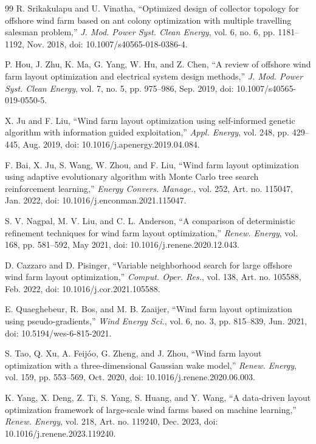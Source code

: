 \documentclass[journal,twoside]{IEEEtran}
\begin{document}
\begin{thebibliography}{99}
R. Srikakulapu and U. Vinatha, ``Optimized design of collector topology for offshore wind farm based on ant colony optimization with multiple travelling salesman problem,'' \textit{J. Mod. Power Syst. Clean Energy}, vol. 6, no. 6, pp. 1181--1192, Nov. 2018, doi: 10.1007/s40565-018-0386-4.

P. Hou, J. Zhu, K. Ma, G. Yang, W. Hu, and Z. Chen, ``A review of offshore wind farm layout optimization and electrical system design methods,'' \textit{J. Mod. Power Syst. Clean Energy}, vol. 7, no. 5, pp. 975--986, Sep. 2019, doi: 10.1007/s40565-019-0550-5.

X. Ju and F. Liu, ``Wind farm layout optimization using self-informed genetic algorithm with information guided exploitation,'' \textit{Appl. Energy}, vol. 248, pp. 429--445, Aug. 2019, doi: 10.1016/j.apenergy.2019.04.084.

F. Bai, X. Ju, S. Wang, W. Zhou, and F. Liu, ``Wind farm layout optimization using adaptive evolutionary algorithm with Monte Carlo tree search reinforcement learning,'' \textit{Energy Convers. Manage.}, vol. 252, Art. no. 115047, Jan. 2022, doi: 10.1016/j.enconman.2021.115047.

S. V. Nagpal, M. V. Liu, and C. L. Anderson, ``A comparison of deterministic refinement techniques for wind farm layout optimization,'' \textit{Renew. Energy}, vol. 168, pp. 581--592, May 2021, doi: 10.1016/j.renene.2020.12.043.

D. Cazzaro and D. Pisinger, ``Variable neighborhood search for large offshore wind farm layout optimization,'' \textit{Comput. Oper. Res.}, vol. 138, Art. no. 105588, Feb. 2022, doi: 10.1016/j.cor.2021.105588.

E. Quaeghebeur, R. Bos, and M. B. Zaaijer, ``Wind farm layout optimization using pseudo-gradients,'' \textit{Wind Energy Sci.}, vol. 6, no. 3, pp. 815--839, Jun. 2021, doi: 10.5194/wes-6-815-2021.

S. Tao, Q. Xu, A. Feij\'oo, G. Zheng, and J. Zhou, ``Wind farm layout optimization with a three-dimensional Gaussian wake model,'' \textit{Renew. Energy}, vol. 159, pp. 553--569, Oct. 2020, doi: 10.1016/j.renene.2020.06.003.

K. Yang, X. Deng, Z. Ti, S. Yang, S. Huang, and Y. Wang, ``A data-driven layout optimization framework of large-scale wind farms based on machine learning,'' \textit{Renew. Energy}, vol. 218, Art. no. 119240, Dec. 2023, doi: 10.1016/j.renene.2023.119240.


\end{thebibliography}
\end{document}
